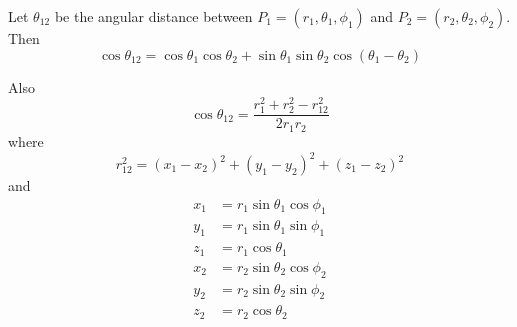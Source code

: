 \documentclass[12pt]{article}
\begin{document}
\noindent
Let $\theta_{12}$ be the angular distance between
$P_1=(r_1,\theta_1,\phi_1)$ and
$P_2=(r_2,\theta_2,\phi_2)$.
Then
\begin{equation*}
\cos\theta_{12}=\cos\theta_1\cos\theta_2+\sin\theta_1\sin\theta_2\cos(\theta_1-\theta_2)
\end{equation*}

\noindent
Also
\begin{equation*}
\cos\theta_{12}=\frac{r_1^2+r_2^2-r_{12}^2}{2r_1r_2}
\end{equation*}
where
\begin{equation*}
r_{12}^2=(x_1-x_2)^2+(y_1-y_2)^2+(z_1-z_2)^2
\end{equation*}
and
\begin{align*}
x_1&=r_1\sin\theta_1\cos\phi_1
\\
y_1&=r_1\sin\theta_1\sin\phi_1
\\
z_1&=r_1\cos\theta_1
\end{align*}
\begin{align*}
x_2&=r_2\sin\theta_2\cos\phi_2
\\
y_2&=r_2\sin\theta_2\sin\phi_2
\\
z_2&=r_2\cos\theta_2
\end{align*}
\end{document}

